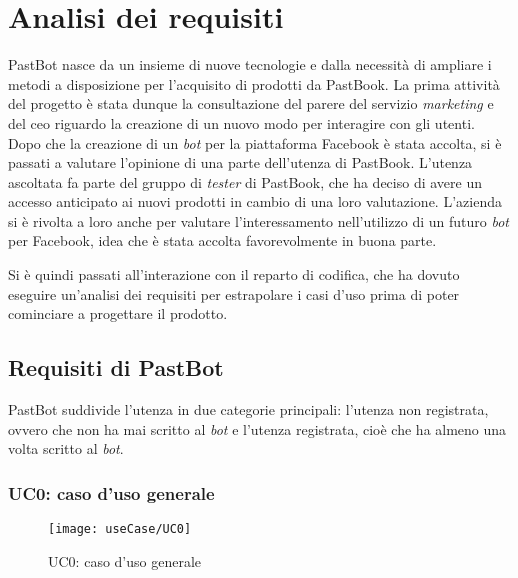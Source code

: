 
\chapter{Analisi dei requisiti}

PastBot nasce da un insieme di nuove tecnologie e dalla necessità di ampliare i
metodi a disposizione per l'acquisito di prodotti da PastBook.
La prima attività del progetto è stata dunque la consultazione del parere del
servizio \textit{marketing} e del \gls{ceo} riguardo la creazione di un nuovo
modo per interagire con gli utenti. Dopo che la creazione di un \textit{bot}
per la piattaforma Facebook è stata accolta, si è passati a valutare l'opinione
di una parte dell'utenza di PastBook. L'utenza ascoltata fa parte del gruppo di
\textit{tester} di PastBook, che ha deciso di avere un accesso anticipato ai
nuovi prodotti in cambio di una loro valutazione. L'azienda si è rivolta a loro
anche per valutare l'interessamento nell'utilizzo di un futuro \textit{bot} per
Facebook, idea che è stata accolta favorevolmente in buona parte.

Si è quindi passati all'interazione con il reparto di codifica, che ha dovuto
eseguire un'analisi dei requisiti per estrapolare i casi d'uso prima di poter
cominciare a progettare il prodotto.

\newpage

\section{Requisiti di PastBot}

PastBot suddivide l'utenza in due categorie principali:
l'utenza non registrata, ovvero che non ha mai scritto al \textit{bot} e
l'utenza registrata, cioè che ha almeno una volta scritto al \textit{bot}.

\subsection{UC0: caso d'uso generale}
\label{uc:uc0}

\begin{figure}[H]
  \centering
  \texttt{[image: useCase/UC0]}
  \caption{UC0: caso d'uso generale}
\end{figure}

